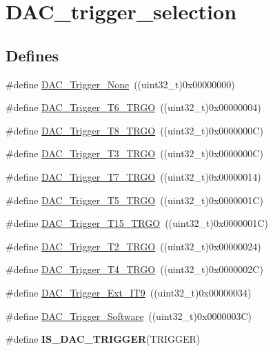 \hypertarget{group__DAC__trigger__selection}{
\section{DAC\_\-trigger\_\-selection}
\label{group__DAC__trigger__selection}
}
\subsection*{Defines}
\begin{DoxyCompactItemize}
\item 
\#define \hyperlink{group__DAC__trigger__selection_ga7849138e043267668d755390d923e4ba}{DAC\_\-Trigger\_\-None}~((uint32\_\-t)0x00000000)
\item 
\#define \hyperlink{group__DAC__trigger__selection_ga083307783678a2f1d3066db57dc84cfe}{DAC\_\-Trigger\_\-T6\_\-TRGO}~((uint32\_\-t)0x00000004)
\item 
\#define \hyperlink{group__DAC__trigger__selection_ga756700c6621eadb807e21a16966580a0}{DAC\_\-Trigger\_\-T8\_\-TRGO}~((uint32\_\-t)0x0000000C)
\item 
\#define \hyperlink{group__DAC__trigger__selection_ga82cbaedc35164c8b9fe0be2faec9b909}{DAC\_\-Trigger\_\-T3\_\-TRGO}~((uint32\_\-t)0x0000000C)
\item 
\#define \hyperlink{group__DAC__trigger__selection_ga9b92d497746be54af46ae4e9c1fc4a6f}{DAC\_\-Trigger\_\-T7\_\-TRGO}~((uint32\_\-t)0x00000014)
\item 
\#define \hyperlink{group__DAC__trigger__selection_ga35352cebfd1ae8a3d63e374a5d86a85d}{DAC\_\-Trigger\_\-T5\_\-TRGO}~((uint32\_\-t)0x0000001C)
\item 
\#define \hyperlink{group__DAC__trigger__selection_ga9f738c0c1366a588ac4fa9e060278c70}{DAC\_\-Trigger\_\-T15\_\-TRGO}~((uint32\_\-t)0x0000001C)
\item 
\#define \hyperlink{group__DAC__trigger__selection_ga3bfbff1e03af1fd17a57a43e57420fe6}{DAC\_\-Trigger\_\-T2\_\-TRGO}~((uint32\_\-t)0x00000024)
\item 
\#define \hyperlink{group__DAC__trigger__selection_ga58ccb2de3d22d66ee975152f5edb330a}{DAC\_\-Trigger\_\-T4\_\-TRGO}~((uint32\_\-t)0x0000002C)
\item 
\#define \hyperlink{group__DAC__trigger__selection_ga67c15b2c26246a2304f9db28e25adcc4}{DAC\_\-Trigger\_\-Ext\_\-IT9}~((uint32\_\-t)0x00000034)
\item 
\#define \hyperlink{group__DAC__trigger__selection_gadef77bb8bbd109232900902402ef637f}{DAC\_\-Trigger\_\-Software}~((uint32\_\-t)0x0000003C)
\item 
\#define {\bfseries IS\_\-DAC\_\-TRIGGER}(TRIGGER)
\end{DoxyCompactItemize}


